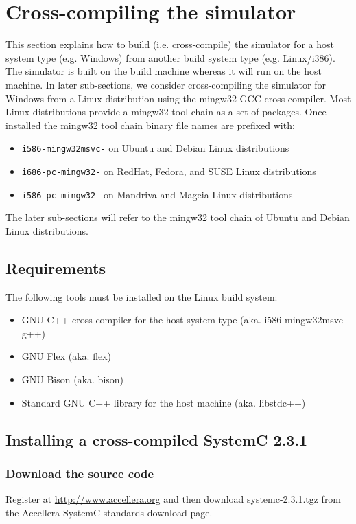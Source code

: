 \section{Cross-compiling the simulator}

This section explains how to build (i.e. cross-compile) the simulator for a host system type (e.g. Windows) from another build system type (e.g. Linux/i386).
The simulator is built on the build machine whereas it will run on the host machine.
In later sub-sections, we consider cross-compiling the simulator for Windows from a Linux distribution using the mingw32 GCC cross-compiler.
Most Linux distributions provide a mingw32 tool chain as a set of packages.
Once installed the mingw32 tool chain binary file names are prefixed with:
\begin{itemize}
\item \texttt{i586-mingw32msvc-} on Ubuntu and Debian Linux distributions
\item \texttt{i686-pc-mingw32-} on RedHat, Fedora, and SUSE Linux distributions
\item \texttt{i586-pc-mingw32-} on Mandriva and Mageia Linux distributions
\end{itemize}
The later sub-sections will refer to the mingw32 tool chain of Ubuntu and Debian Linux distributions.

\subsection{Requirements}

\noindent The following tools must be installed on the Linux build system:
\begin{itemize}
\item GNU C++ cross-compiler for the host system type (aka. i586-mingw32msvc-g++)
\item GNU Flex (aka. flex)
\item GNU Bison (aka. bison)
\item Standard GNU C++ library for the host machine (aka. libstdc++)
\end{itemize}

\subsection{Installing a cross-compiled SystemC 2.3.1}
\subsubsection{Download the source code}
Register at \url{http://www.accellera.org} and then download systemc-2.3.1.tgz from the Accellera SystemC standards download page.

